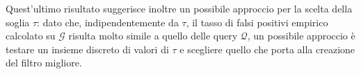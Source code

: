\documentclass[../../main.tex]{subfiles}
\begin{document}
    Quest'ultimo risultato suggerisce inoltre un possibile approccio per la scelta della soglia $\tau$: dato che, indipendentemente da $\tau$, il tasso di falsi positivi empirico calcolato su $\mathcal{G}$ risulta molto simile a quello delle query $\mathcal{Q}$, un possibile approccio è testare un insieme discreto di valori di $\tau$ e scegliere quello che porta alla creazione del filtro migliore.
\end{document}
